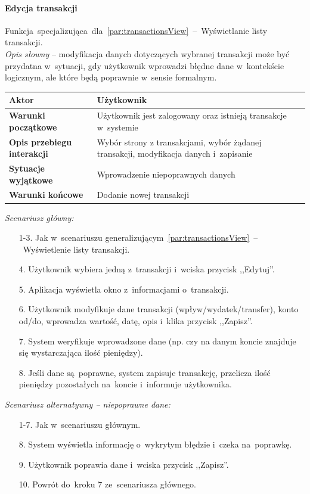 \paragraph{Edycja transakcji\newline}
\label{par:transactionEdit}
Funkcja~specjalizująca~dla~\ref{par:transactionsView}~--~Wyświetlanie listy transakcji.\\

\textit{Opis słowny} -- modyfikacja danych dotyczących wybranej transakcji może być przydatna w~sytuacji, gdy użytkownik wprowadzi błędne dane w~kontekście logicznym, ale które będą poprawnie w~sensie formalnym.

\begin{longtable}{|p{5cm}|p{7cm}|}
  \hline \textbf{Aktor} & Użytkownik \\
  \hline \textbf{Warunki początkowe} & Użytkownik jest zalogowany oraz istnieją transakcje w~systemie \\
  \hline \textbf{Opis przebiegu interakcji} & Wybór strony z transakcjami, wybór żądanej transakcji, modyfikacja danych i~zapisanie \\
  \hline \textbf{Sytuacje wyjątkowe} & Wprowadzenie niepoprawnych danych \\
  \hline \textbf{Warunki końcowe} & Dodanie nowej transakcji \\
  \hline
\end{longtable}

\noindent \textit{Scenariusz główny:}
\begin{enumerate}
  \item[1-3.] Jak w~scenariuszu generalizującym~\ref{par:transactionsView}~--~Wyświetlenie listy transakcji.
  \item[4.] Użytkownik wybiera jedną z~transakcji i~wciska przycisk ,,Edytuj''.
  \item[5.] Aplikacja wyświetla okno z~informacjami o~transakcji.
  \item[6.] Użytkownik modyfikuje dane transakcji (wpływ/wydatek/transfer), konto od/do, wprowadza wartość, datę, opis i~klika przycisk ,,Zapisz''.
  \item[7.] System weryfikuje wprowadzone dane (np. czy na danym koncie znajduje się wystarczająca ilość pieniędzy).
  \item[8.] Jeśli dane są~poprawne, system zapisuje transakcję, przelicza ilość pieniędzy pozostałych na~koncie i~informuje użytkownika.
\end{enumerate}

\noindent \textit{Scenariusz alternatywny -- niepoprawne dane:}
\begin{enumerate}
  \item[1-7.] Jak w~scenariuszu głównym.
  \item[8.] System wyświetla informację o~wykrytym błędzie i~czeka na~poprawkę.
  \item[9.] Użytkownik poprawia dane i~wciska przycisk ,,Zapisz''.
  \item[10.] Powrót do~kroku 7 ze~scenariusza głównego.
\end{enumerate}


